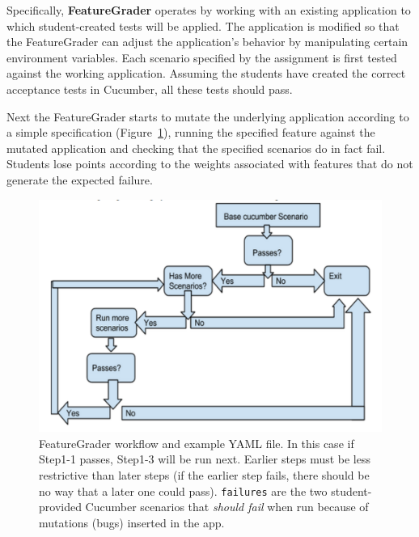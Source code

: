 Specifically, \textbf{FeatureGrader} operates by working with an
existing application to which student-created tests will be applied.   The application is modified so that the FeatureGrader
can adjust the application's behavior by manipulating certain environment variables. Each  scenario 
specified by the assignment is first tested against the working application.  Assuming the 
students have created the correct acceptance tests in Cucumber, all these tests should pass.  

Next the FeatureGrader starts to mutate the underlying application
according to a simple specification (Figure~\ref{fig:featuregrader}), running the specified feature against
the mutated application and checking that the specified scenarios do in fact fail.  Students 
lose points according to the weights associated with features that do not generate the expected failure.


\begin{figure}
  \begin{minipage}{0.45\textwidth}%
  \includegraphics[width=\textwidth]{figs/feature_grader.pdf}%
  \end{minipage}%
  \begin{minipage}{0.55\textwidth}%
  \end{minipage}
  \caption{\label{fig:featuregrader}%
FeatureGrader workflow and example YAML file.  In this case if Step1-1 passes,
Step1-3 will be run next.  Earlier steps must be less restrictive than
later steps (if the earlier step fails, there should be no way that a later one could pass).
\texttt{failures} are the two student-provided Cucumber scenarios that \emph{should fail} when
run because of mutations (bugs) inserted in the app.
}
\end{figure}

